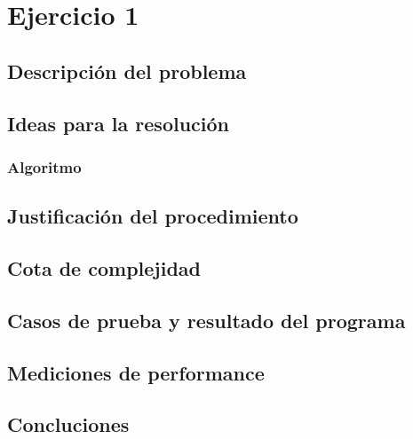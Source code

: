\section{Ejercicio 1}

\subsection{Descripci\'on del problema} \label{ej_1:descripcion}

\subsection{Ideas para la resoluci\'on} \label{ej_1:idea}

\subsubsection{Algoritmo} \label{ej_1:algoritmo}

\subsection{Justificaci\'on del procedimiento} \label{ej_1:justificacion}

\subsection{Cota de complejidad} \label{ej_1:cota}

\subsection{Casos de prueba y resultado del programa} \label{ej_1:casos}

\subsection{Mediciones de performance} \label{ej_1:performance}

\subsection{Concluciones} \label{ej_1:concluciones}

